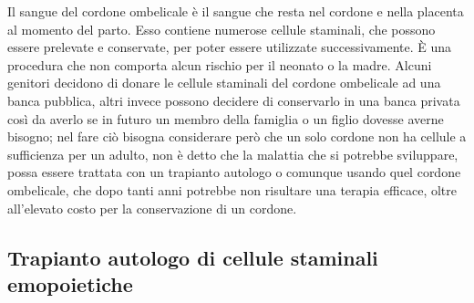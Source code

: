 Il sangue del cordone ombelicale è il sangue che resta nel cordone e nella placenta al momento del parto. 
Esso contiene numerose cellule staminali, che possono essere prelevate e conservate, per poter essere utilizzate 
successivamente. È una procedura che non comporta alcun rischio per il neonato o la madre. 
Alcuni genitori decidono di donare le cellule staminali del cordone ombelicale ad una banca pubblica, altri invece 
possono decidere di conservarlo in una banca privata così da averlo se in futuro un membro della famiglia o un figlio 
dovesse averne bisogno; nel fare ciò bisogna considerare però che un solo cordone non ha cellule a sufficienza per un 
adulto, non è detto che la malattia che si potrebbe sviluppare, possa essere trattata con un trapianto autologo o 
comunque usando quel cordone ombelicale, che dopo tanti anni potrebbe non risultare una terapia efficace, oltre 
all’elevato costo per la conservazione di un cordone\cite{STEMCELLS}.\\

\subsection{Trapianto autologo di cellule staminali emopoietiche}

